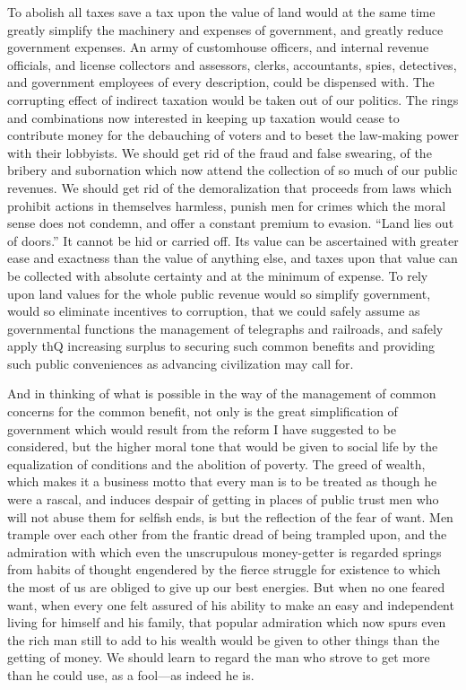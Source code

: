 \documentclass{book}
\begin{document}
To abolish all taxes save a tax upon the value of land would at the same time greatly simplify the machinery and expenses of government, and greatly reduce government expenses. An army of customhouse officers, and internal revenue officials, and license collectors and assessors, clerks, accountants, spies, detectives, and government employees of every description, could be dispensed with. The corrupting effect of indirect taxation would be taken out of our politics. The rings and combinations now interested in keeping up taxation would cease to contribute money for the debauching of voters and to beset the law-making power with their lobbyists. We should get rid of the fraud and false swearing, of the bribery and subornation which now attend the collection of so much of our public revenues. We should get rid of the demoralization that proceeds from laws which prohibit actions in themselves harmless, punish men for crimes which the moral sense does not condemn, and offer a constant premium to evasion. “Land lies out of doors.” It cannot be hid or carried off. Its value can be ascertained with greater ease and exactness than the value of anything else, and taxes upon that value can be collected with absolute certainty and at the minimum of expense. To rely upon land values for the whole public revenue would so simplify government, would so eliminate incentives to corruption, that we could safely assume as governmental functions the management of telegraphs and railroads, and safely apply thQ increasing surplus to securing such common benefits and providing such public conveniences as advancing civilization may call for.

And in thinking of what is possible in the way of the management of common concerns for the common benefit, not only is the great simplification of government which would result from the reform I have suggested to be considered, but the higher moral tone that would be given to social life by the equalization of conditions and the abolition of poverty. The greed of wealth, which makes it a business motto that every man is to be treated as though he were a rascal, and induces despair of getting in places of public trust men who will not abuse them for selfish ends, is but the reflection of the fear of want. Men trample over each other from the frantic dread of being trampled upon, and the admiration with which even the unscrupulous money-getter is regarded springs from habits of thought engendered by the fierce struggle for existence to which the most of us are obliged to give up our best energies. But when no one feared want, when every one felt assured of his ability to make an easy and independent living for himself and his family, that popular admiration which now spurs even the rich man still to add to his wealth would be given to other things than the getting of money. We should learn to regard the man who strove to get more than he could use, as a fool—as indeed he is.
\end{document}
